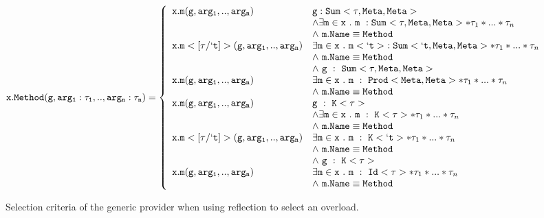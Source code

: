 \documentclass{sigplanconf}
\begin{document}
\begin{figure*}
\[
\mathtt{x.Method(g,arg_1:\tau_1,..,arg_n:\tau_n)} =
\left\{
  \begin{array}{ll}
    \mathtt{x.m}(\mathtt{g},\mathtt{arg_1,..,arg_n}) & \mathtt{g} : \Sum<\tau,\Meta,\Meta> \\ & \wedge \exists \mathtt{m} \in \mathtt{x}\ .\ \mathtt{m}\ : \Sum<\tau,\Meta,\Meta>*\tau_1*...*\tau_n \\ & \wedge\ \mathtt{m.Name} \equiv \mathtt{Method} \\
    
    \mathtt{x.m}<\mathtt{[\tau/`t]}>(\mathtt{g},\mathtt{arg_1,..,arg_n}) & \exists \mathtt{m} \in \mathtt{x}\ .\ \mathtt{m}<\mathtt{`t}>\ : \Sum<\mathtt{`t},\Meta,\Meta>*\tau_1*...*\tau_n \\ & \wedge\ \mathtt{m.Name} \equiv \mathtt{Method} \\ &\wedge\ \mathtt{g}\ :\ \Sum<\tau,\Meta,\Meta> \\
    
    \mathtt{x.m}(\mathtt{g},\mathtt{arg_1,..,arg_n}) & \exists \mathtt{m} \in \mathtt{x}\ .\ \mathtt{m}\ :\ \Prod<\Meta,\Meta>*\tau_1*...*\tau_n \\ & \wedge\ \mathtt{m.Name} \equiv \mathtt{Method} \\
    
    \mathtt{x.m}(\mathtt{g},\mathtt{arg_1,..,arg_n}) & \mathtt{g}\ :\ \K<\tau> \\ & \wedge\exists \mathtt{m} \in \mathtt{x}\ .\ \mathtt{m}\ :\ \K<\tau>*\tau_1*...*\tau_n \\ & \wedge\ \mathtt{m.Name} \equiv \mathtt{Method} \\

    \mathtt{x.m}<[\tau/\mathtt{`t}]>(\mathtt{g},\mathtt{arg_1,..,arg_n}) & \exists \mathtt{m} \in \mathtt{x}\ .\ \mathtt{m}\ :\ \K<\mathtt{`t}>*\tau_1*...*\tau_n \\ & \wedge\ \mathtt{m.Name} \equiv \mathtt{Method} \\ & \wedge\ \mathtt{g}\ :\ \K<\tau> \\

    \mathtt{x.m}(\mathtt{g},\mathtt{arg_1,..,arg_n}) & \exists \mathtt{m} \in \mathtt{x}\ .\ \mathtt{m}\ :\ \Id<\tau>*\tau_1*...*\tau_n \\ & \wedge\ \mathtt{m.Name} \equiv \mathtt{Method} \\
  \end{array}
\right.
\]
\caption{Selection criteria of the generic provider when using reflection to select an overload.}
\label{fig:selector}
\end{figure*}
\end{document}
